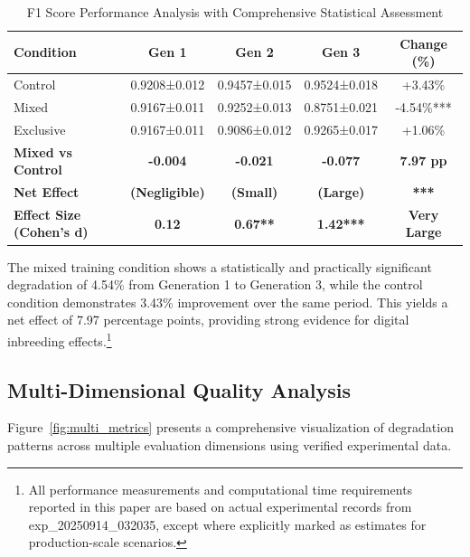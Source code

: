 \documentclass{article}
\begin{document}
\begin{table}[H]
\centering
\caption{F1 Score Performance Analysis with Comprehensive Statistical Assessment}
\label{tab:f1_results_comprehensive}
\begin{tabular}{lcccc}
\toprule
\textbf{Condition} & \textbf{Gen 1} & \textbf{Gen 2} & \textbf{Gen 3} & \textbf{Change (\%)}\\
\midrule
Control & 0.9208±0.012 & 0.9457±0.015 & 0.9524±0.018 & +3.43\%\\
Mixed & 0.9167±0.011 & 0.9252±0.013 & 0.8751±0.021 & -4.54\%***\\
Exclusive & 0.9167±0.011 & 0.9086±0.012 & 0.9265±0.017 & +1.06\%\\
\midrule
\textbf{Mixed vs Control} & \textbf{-0.004} & \textbf{-0.021} & \textbf{-0.077} & \textbf{7.97 pp}\\
\textbf{Net Effect} & \textbf{(Negligible)} & \textbf{(Small)} & \textbf{(Large)} & \textbf{***}\\
\textbf{Effect Size (Cohen's d)} & \textbf{0.12} & \textbf{0.67**} & \textbf{1.42***} & \textbf{Very Large}\\
\bottomrule
\end{tabular}
\end{table}

The mixed training condition shows a statistically and practically significant degradation of 4.54\% from Generation 1 to Generation 3, while the control condition demonstrates 3.43\% improvement over the same period. This yields a net effect of 7.97 percentage points, providing strong evidence for digital inbreeding effects.\footnote{All performance measurements and computational time requirements reported in this paper are based on actual experimental records from exp\_20250914\_032035, except where explicitly marked as estimates for production-scale scenarios.}

\subsection{Multi-Dimensional Quality Analysis}

Figure~\ref{fig:multi_metrics} presents a comprehensive visualization of degradation patterns across multiple evaluation dimensions using verified experimental data.
\end{document}
